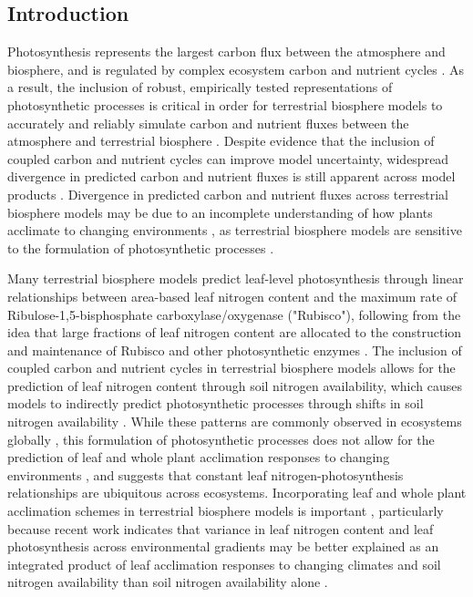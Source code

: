 \begin{singlespace}
    \chapter{\textbf{Introduction}}
\end{singlespace}

Photosynthesis represents the largest carbon flux between the atmosphere and biosphere, and is regulated by complex ecosystem carbon and nutrient cycles . As a result, the inclusion of robust, empirically tested representations of photosynthetic processes is critical in order for terrestrial biosphere models to accurately and reliably simulate carbon and nutrient fluxes between the atmosphere and terrestrial biosphere . Despite evidence that the inclusion of coupled carbon and nutrient cycles can improve model uncertainty, widespread divergence in predicted carbon and nutrient fluxes is still apparent across model products . Divergence in predicted carbon and nutrient fluxes across terrestrial biosphere models may be due to an incomplete understanding of how plants acclimate to changing environments , as terrestrial biosphere models are sensitive to the formulation of photosynthetic processes .

Many terrestrial biosphere models predict leaf-level photosynthesis through linear relationships between area-based leaf nitrogen content and the maximum rate of Ribulose-1,5-bisphosphate carboxylase/oxygenase ("Rubisco"), following from the idea that large fractions of leaf nitrogen content are allocated to the construction and maintenance of Rubisco and other photosynthetic enzymes . The inclusion of coupled carbon and nutrient cycles in terrestrial biosphere models  allows for the prediction of leaf nitrogen content through soil nitrogen availability, which causes models to indirectly predict photosynthetic processes through shifts in soil nitrogen availability . While these patterns are commonly observed in ecosystems globally , this formulation of photosynthetic processes does not allow for the prediction of leaf and whole plant acclimation responses to changing environments , and suggests that constant leaf nitrogen-photosynthesis relationships are ubiquitous across ecosystems. Incorporating leaf and whole plant acclimation schemes in terrestrial biosphere models is important , particularly because recent work indicates that variance in leaf nitrogen content and leaf photosynthesis across environmental gradients may be better explained as an integrated product of leaf acclimation responses to changing climates and soil nitrogen availability than soil nitrogen availability alone .

